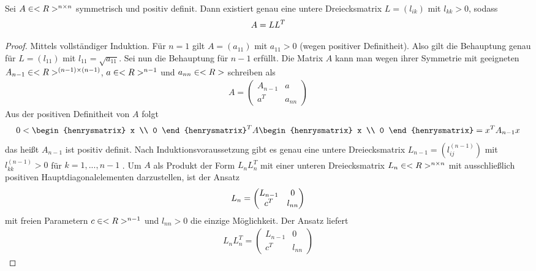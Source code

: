 \begin{proposition}
	Sei $A\in<R>^{n\times n}$ symmetrisch und positiv definit. Dann existiert genau eine untere Dreiecksmatrix $L=(l_{ik})$ mit $l_{kk}>0$, sodass
	\begin{align}
		A=LL^T\notag
	\end{align}
\end{proposition}
\begin{proof}
	Mittels vollständiger Induktion. Für $n=1$ gilt $A=(a_{11})$ mit $a_{11}>0$ (wegen positiver Definitheit). Also gilt die Behauptung genau für $L=(l_{11})$ mit $l_{11}=\sqrt{a_{11}}$. Sei nun die Behauptung für $n-1$ erfüllt. Die Matrix $A$ kann man wegen ihrer Symmetrie mit geeigneten $A_{n-1}\in<R>^{(n-1)\times (n-1)}$, $a\in<R>^{n-1}$ und $a_{nn}\in<R>$ schreiben als
	\begin{align}
		\label{3.6}
		A = \begin{pmatrix}
			A_{n-1} & a \\ a^T & a_{nn}
		\end{pmatrix}
	\end{align}
	Aus der positiven Definitheit von $A$ folgt
	\begin{align}
		0 < \begin{henrysmatrix}
			x \\ 0
		\end{henrysmatrix}^T A \begin{henrysmatrix}
			x \\ 0
		\end{henrysmatrix} = x^TA_{n-1}x
	\end{align}
	das heißt $A_{n-1}$ ist positiv definit. Nach Induktionsvoraussetzung gibt es genau eine untere Dreiecksmatrix $L_{n-1}=(l_{ij}^{(n-1)})$ mit $l_{kk}^{(n-1)}>0$ für $k=1,...,n-1$ . Um $A$ als Produkt der Form $L_nL_n^T$ mit einer unteren Dreiecksmatrix $L_n\in<R>^{n\times n}$ mit ausschließlich positiven Hauptdiagonalelementen darzustellen, ist der Ansatz
	\begin{align}
		L_n = \begin{pmatrix}
			L_{n-1} & 0 \\ c^T & l_{nn}
		\end{pmatrix}\notag
	\end{align}
	mit freien Parametern $c\in<R>^{n-1}$ und $l_{nn}>0$ die einzige Möglichkeit. Der Ansatz liefert
	\begin{align}
		L_nL_n^T = \begin{pmatrix}
			L_{n-1} & 0 \\ c^T & l_{nn}

\end{pmatrix}
\end{align}
\end{proof}
